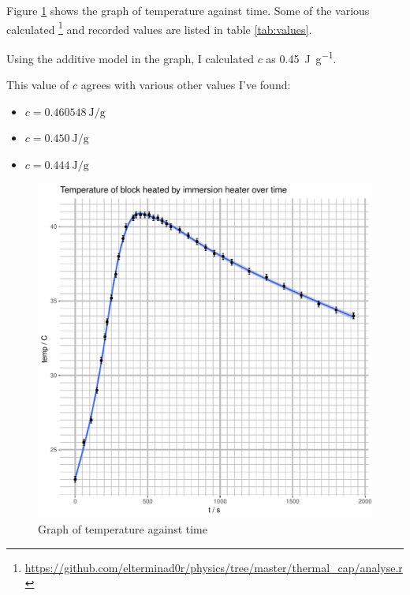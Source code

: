 \documentclass[a4paper,11pt]{article}
\begin{document}
Figure \ref{fig:graph} shows the graph of temperature against time. Some of the
various calculated
\footnote{\url{https://github.com/elterminad0r/physics/tree/master/thermal_cap/analyse.r}}
and recorded values are listed in table \ref{tab:values}.

Using the additive model in the graph, I calculated $c$ as
\SI{0.45}{\joule\per\gram}.

This value of $c$ agrees with various other values I've found:

\begin{itemize}
\item $c = \SI{0.460548}{\joule\per\gram}$ \cite{EngineersEdge}
\item $c = \SI{0.450}{\joule\per\gram}$ \cite{DeLeon}
\item $c = \SI{0.444}{\joule\per\gram}$ \cite{Stretton}
\end{itemize}

\begin{figure}[h]
\begin{center}
\includegraphics{Rplots.pdf}
\end{center}
\caption{Graph of temperature against time}\label{fig:graph}
\end{figure}
\end{document}
